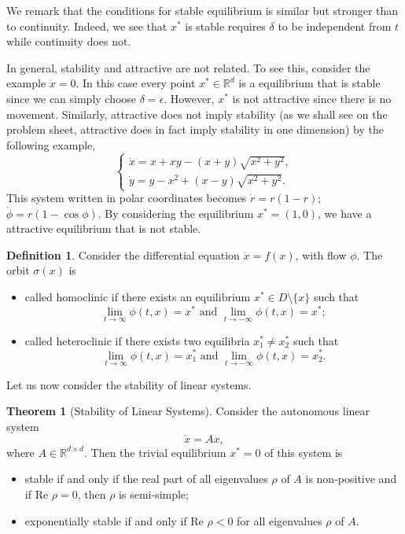 \documentclass[
]{article}
\theoremstyle{definition}
\newtheorem{theorem}{Theorem}
\theoremstyle{definition}
\newtheorem{definition}{Definition}[section]
\begin{document}
We remark that the conditions for stable equilibrium is similar but
stronger than to continuity. Indeed, we see that \(x^*\) is stable
requires \(\delta\) to be independent from \(t\) while continuity does
not.

In general, stability and attractive are not related. To see this,
consider the example \(\dot x = 0\). In this case every point
\(x^* \in \mathbb{R}^d\) is a equilibrium that is stable since we can
simply choose \(\delta = \epsilon\). However, \(x^*\) is not attractive
since there is no movement. Similarly, attractive does not imply
stability (as we shall see on the problem sheet, attractive does in fact
imply stability in one dimension) by the following example,
\[\begin{cases}
  \dot x = x + xy - (x + y)\sqrt{x^2 + y^2},\\
  \dot y = y - x^2 + (x - y)\sqrt{x^2 + y^2}.
\end{cases}\] This system written in polar coordinates becomes
\(\dot r = r(1 - r)\); \(\dot \phi = r(1 - \cos \phi)\). By considering
the equilibrium \(x^* = (1, 0)\), we have a attractive equilibrium that
is not stable.

\begin{definition}
  Consider the differential equation \(\dot x = f(x)\), with flow \(\phi\). 
  The orbit \(\sigma(x)\) is 
  \begin{itemize}
    \item called homoclinic if there exists an equilibrium \(x^* \in D \setminus \{x\}\) 
      such that 
      \[\lim_{t \to \infty} \phi(t, x) = x^* \text{ and } 
        \lim_{t \to -\infty} \phi(t, x) = x^*;\]
    \item called heteroclinic if there exists two equilibria \(x_1^* \neq x_2^*\) 
      such that
      \[\lim_{t \to \infty} \phi(t, x) = x_1^* \text{ and } 
        \lim_{t \to -\infty} \phi(t, x) = x_2^*.\]
  \end{itemize}
\end{definition}

Let us now consider the stability of linear systems.

\begin{theorem}[Stability of Linear Systems]
  Consider the autonomous linear system 
  \[\dot x = Ax,\]
  where \(A \in \mathbb{R}^{d \times d}\). Then the trivial equilibrium \(x^* = 0\) 
  of this system is 
  \begin{itemize}
    \item stable if and only if the real part of all eigenvalues \(\rho\) of \(A\) is 
      non-positive and if \(\text{Re } \rho = 0\), then \(\rho\) is semi-simple;
    \item exponentially stable if and only if \(\text{Re } \rho < 0\) for all 
      eigenvalues \(\rho\) of \(A\).
  \end{itemize}
\end{theorem}
\end{document}
